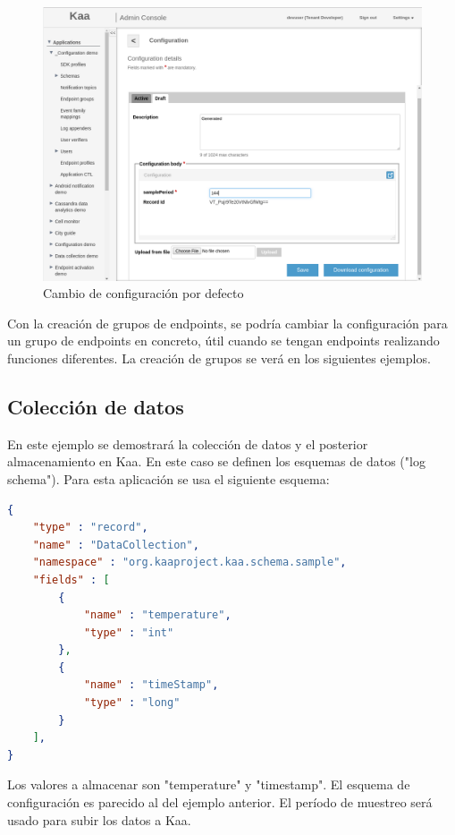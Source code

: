 \documentclass[12pt, twoside]{book}
\begin{document}
\begin{figure}[H]
\centering
\includegraphics[scale=0.3]{images/config_demo_4}
\caption{Cambio de configuración por defecto}\label{L508}
\end{figure}

Con la creación de grupos de endpoints, se podría cambiar la configuración para un grupo de endpoints en concreto, útil cuando se tengan endpoints realizando funciones diferentes. La creación de grupos se verá en los siguientes ejemplos.
\subsection{Colección de datos}
En este ejemplo se demostrará la colección de datos y el posterior almacenamiento en Kaa. En este caso se definen los esquemas de datos ("log schema"). Para esta aplicación se usa el siguiente esquema:
\begin{lstlisting}[language=json]
{
	"type" : "record",
	"name" : "DataCollection",
	"namespace" : "org.kaaproject.kaa.schema.sample",
	"fields" : [
		{
			"name" : "temperature",
			"type" : "int"
		},
		{
			"name" : "timeStamp",
			"type" : "long"
		}
	],
}
\end{lstlisting}
Los valores a almacenar son "temperature" y "timestamp". El esquema de configuración es parecido al del ejemplo anterior. El período de muestreo será usado para subir los datos a Kaa.\\
\end{document}
